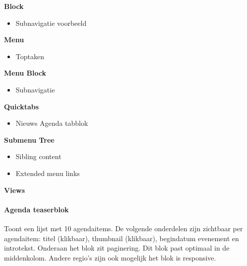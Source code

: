 \textbf{Block}

\begin{itemize}
\item Subnavigatie voorbeeld
\end{itemize}

\textbf{Menu}

\begin{itemize}
\item Toptaken
\end{itemize}

\textbf{Menu Block}

\begin{itemize}
\item Subnavigatie
\end{itemize}

\textbf{Quicktabs}

\begin{itemize}
\item Nieuws Agenda tabblok
\end{itemize}

\textbf{Submenu Tree}

\begin{itemize}
\item Sibling content
\item Extended menu links
\end{itemize}

\textbf{Views}

\paragraph{Agenda teaserblok}

Toont een lijst met 10 agendaitems. De volgende onderdelen zijn zichtbaar per agendaitem: titel (klikbaar), thumbnail (klikbaar), begindatum evenement en introtekst. Onderaan het blok zit paginering. Dit blok past optimaal in de middenkolom. Andere regio's zijn ook mogelijk het blok is responsive.

